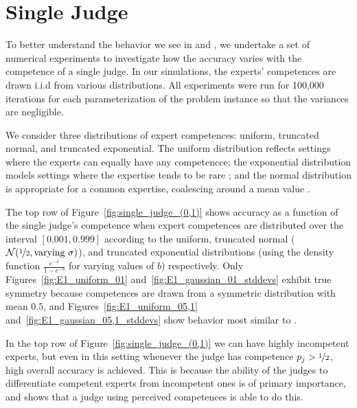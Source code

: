 \documentclass[letterpaper]{article} %
\newcommand{\judge}{\ensuremath{j} }
\newcommand{\ben}[1]{\textcolor{red}{Ben says: #1}}
\newcommand{\omer}[1]{\textcolor{purple}{Omer says: #1}}
\begin{document}
\section{Single Judge}
To better understand the behavior we see in  and , we undertake a set of numerical experiments to investigate how the accuracy varies with the competence of a single judge.
%
In our simulations, the experts' competences are drawn i.i.d from various distributions. All experiments were run for 100,000 iterations for each parameterization of the problem instance so that the variances are negligible.

We consider three distributions of expert competences: uniform, truncated normal, and truncated exponential. The uniform distribution reflects settings where the experts can equally have any competencce; the exponential distribution models settings where the expertise tends to be rare%
; and the normal distribution is appropriate for a common expertise, coalescing around a mean value \cite{Tal07}. %

The top row of Figure~\ref{fig:single_judge_(0,1)} shows accuracy as a function of the single judge's competence when expert competences are distributed over the interval $[0.001, 0.999]$ according to the uniform, truncated normal ($\mathcal{N}(\nicefrac{1}{2},\text{varying }\sigma)$), and truncated exponential distributions (using the density function $\frac{e^{-x}}{1-e^{-b}}$ for varying values of $b$) respectively. Only Figures~\ref{fig:E1_uniform_01} and~\ref{fig:E1_gaussian_01_stddevs} exhibit true symmetry because competences are drawn from a symmetric distribution with mean $0.5$, and Figures~\ref{fig:E1_uniform_05,1} and~\ref{fig:E1_gaussian_05,1_stddevs} show behavior most similar to .%

In the top row of Figure~\ref{fig:single_judge_(0,1)} we can have highly incompetent experts, but even in this setting whenever the judge has competence $p_\judge > \nicefrac{1}{2}$, high overall accuracy is achieved. This is because the ability of the judges to differentiate competent experts from incompetent ones is of primary importance, and  shows that a judge using perceived competences is able to do this.
\end{document}

